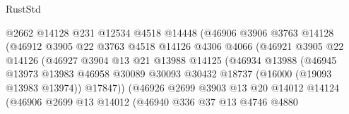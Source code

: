 \begin{lexlean}{RustStd}
\begin{coremodule}
                                @2662
                                @14128
                                @231
                                @12534
                                @4518
                                @14448
                                (@46906
                                  @3906
                                  @3763
                                  @14128
                                  (@46912
                                    @3905
                                    @22
                                    @3763
                                    @4518
                                    @14126
                                    @4306
                                    @4066
                                    (@46921
                                      @3905
                                      @22
                                      @14126
                                      (@46927
                                        @3904
                                        @13
                                        @21
                                        @13988
                                        @14125
                                        (@46934
                                          @13988
                                          (@46945
                                            @13973
                                            @13983
                                            @46958
                                            @30089
                                            @30093
                                            @30432
                                            @18737
                                            (@16000 (@19093 @13983 @13974))
                                            @17847))
                                        (@46926
                                          @2699
                                          @3903
                                          @13
                                          @20
                                          @14012
                                          @14124
                                          (@46906
                                            @2699
                                            @13
                                            @14012
                                            (@46940
                                              @336
                                              @37
                                              @13
                                              @4746
                                              @4880

\end{coremodule}
\end{lexlean}
